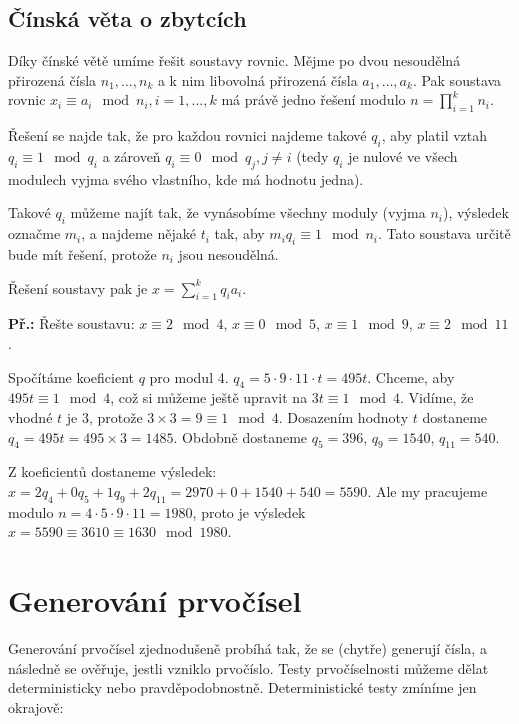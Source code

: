 \documentclass[10pt,a4paper]{article}
\begin{document}
\subsection{Čínská věta o zbytcích}
Díky čínské větě umíme řešit soustavy rovnic. Mějme po dvou nesoudělná přirozená
čísla $n_1, \ldots, n_k$ a k nim libovolná přirozená čísla $a_1,\ldots,a_k$. Pak
soustava rovnic $x_i \equiv a_i \mod n_i, i = 1,\ldots,k$ má právě jedno řešení
modulo $n = \prod_{i=1}^{k}n_i$.

Řešení se najde tak, že pro každou rovnici najdeme takové $q_i$, aby platil
vztah $q_i \equiv 1 \mod q_i$ a zároveň $q_i \equiv 0 \mod q_j, j \neq i$ (tedy
$q_i$ je nulové ve všech modulech vyjma svého vlastního, kde má hodnotu jedna).

Takové $q_i$ můžeme najít tak, že vynásobíme všechny moduly (vyjma $n_i$),
výsledek označme $m_i$, a najdeme nějaké $t_i$ tak, aby $m_iq_i \equiv 1 \mod
n_i$. Tato soustava určitě bude mít řešení, protože $n_i$ jsou nesoudělná.

Řešení soustavy pak je $x = \sum_{i=1}^{k}q_ia_i$.

\begin{exercise}
\textbf{Př.:} Řešte soustavu: $x \equiv 2 \mod 4$, $x \equiv 0 \mod 5$, $x
\equiv 1 \mod 9$, $x \equiv 2 \mod 11$.

Spočítáme koeficient $q$ pro modul 4. $q_4 = 5\cdot9\cdot11\cdot t = 495t$.
Chceme, aby $495t \equiv 1 \mod 4$, což si můžeme ještě upravit na $3t \equiv 1
\mod 4$. Vidíme, že vhodné $t$ je 3, protože $3\times 3 = 9 \equiv 1 \mod 4$.
Dosazením hodnoty $t$ dostaneme $q_4 = 495t = 495 \times 3 = 1485$. Obdobně
dostaneme $q_5 = 396$, $q_9 = 1540$, $q_{11} = 540$.

Z koeficientů dostaneme výsledek: $x = 2q_4 + 0q_5 + 1q_9 + 2q_{11} = 2970 + 0 +
1540 + 540 = 5590$. Ale my pracujeme modulo $n = 4\cdot5\cdot9\cdot11 = 1980$,
proto je výsledek $x = 5590 \equiv 3610 \equiv 1630 \mod 1980$.

\end{exercise}

\section{Generování prvočísel}
Generování prvočísel zjednodušeně probíhá tak, že se (chytře) generují čísla, a
následně se ověřuje, jestli vzniklo prvočíslo. Testy prvočíselnosti můžeme dělat
deterministicky nebo pravděpodobnostně. Deterministické testy zmíníme jen
okrajově:
\end{document}
